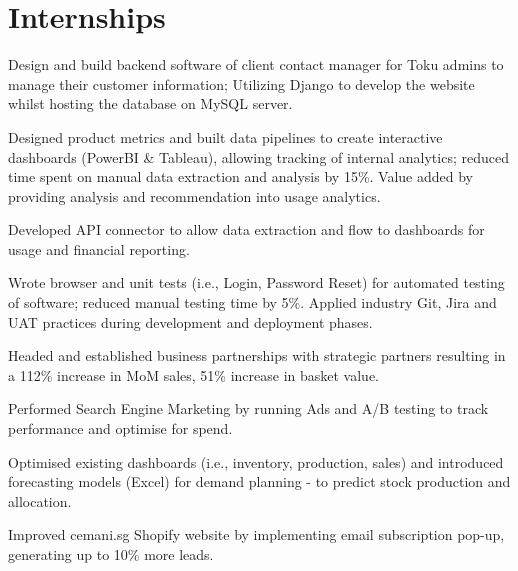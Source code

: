 \documentclass[]{deedy-resume}
\begin{document}
\begin{minipage}[t]{0.66\textwidth} 


\section{Internships}
\vspace{\topsep} %
\begin{tightemize}
\item Design and build backend software of client contact manager for Toku admins to manage their customer information; Utilizing Django to develop the website whilst hosting the database on MySQL server.
\end{tightemize}
\sectionsep

\begin{tightemize}
\item Designed product metrics and built data pipelines to create interactive dashboards (PowerBI \& Tableau), allowing tracking of internal analytics; reduced time spent on manual data extraction and analysis by 15\%. Value added by providing analysis and recommendation into usage analytics.
\item Developed API connector to allow data extraction and flow to dashboards for usage and financial reporting.
\item Wrote browser and unit tests (i.e., Login, Password Reset) for automated testing of software; reduced manual testing time
by 5\%. Applied industry Git, Jira and UAT practices during development and deployment phases.
\end{tightemize}
\sectionsep

\begin{tightemize}
\item Headed and established business partnerships with strategic partners resulting in a 112\% increase in MoM sales, 51\% increase in basket value.
\item Performed Search Engine Marketing by running Ads and A/B testing to track performance and optimise for spend.
\item Optimised existing dashboards (i.e., inventory, production, sales) and introduced forecasting models (Excel) for demand planning - to predict stock production and allocation.
\item Improved cemani.sg Shopify website by implementing email subscription pop-up, generating up to 10\% more leads.


\end{tightemize}
\end{minipage}
\end{document}
